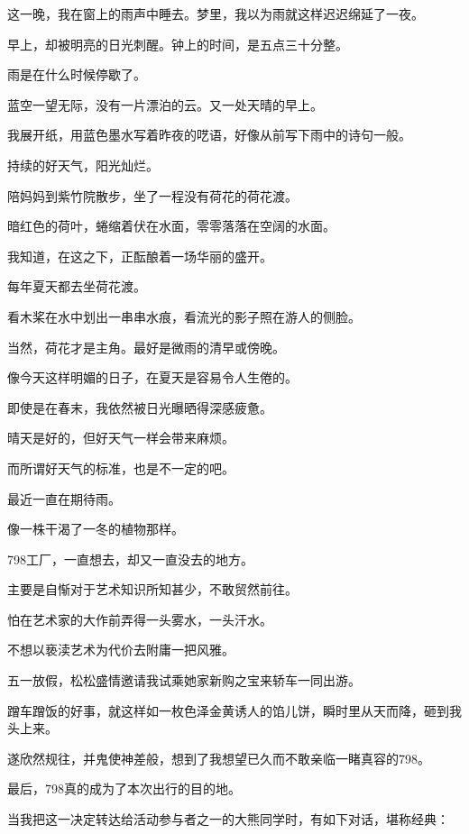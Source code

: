 		这一晚，我在窗上的雨声中睡去。梦里，我以为雨就这样迟迟绵延了一夜。\par
		早上，却被明亮的日光刺醒。钟上的时间，是五点三十分整。

		雨是在什么时候停歇了。

		蓝空一望无际，没有一片漂泊的云。又一处天晴的早上。\par
		我展开纸，用蓝色墨水写着昨夜的呓语，好像从前写下雨中的诗句一般。

	\endwriting



		持续的好天气，阳光灿烂。\par
		陪妈妈到紫竹院散步，坐了一程没有荷花的荷花渡。\par
		暗红色的荷叶，蜷缩着伏在水面，零零落落在空阔的水面。\par
		我知道，在这之下，正酝酿着一场华丽的盛开。\par
		每年夏天都去坐荷花渡。\par
		看木桨在水中划出一串串水痕，看流光的影子照在游人的侧脸。\par
		当然，荷花才是主角。最好是微雨的清早或傍晚。\par
		像今天这样明媚的日子，在夏天是容易令人生倦的。\par
		即使是在春末，我依然被日光曝晒得深感疲惫。\par
		晴天是好的，但好天气一样会带来麻烦。\par
		而所谓好天气的标准，也是不一定的吧。\par
		最近一直在期待雨。\par
		像一株干渴了一冬的植物那样。

	\endwriting



		798工厂，一直想去，却又一直没去的地方。\par
		主要是自惭对于艺术知识所知甚少，不敢贸然前往。\par
		怕在艺术家的大作前弄得一头雾水，一头汗水。\par
		不想以亵渎艺术为代价去附庸一把风雅。

		五一放假，松松盛情邀请我试乘她家新购之宝来轿车一同出游。\par
		蹭车蹭饭的好事，就这样如一枚色泽金黄诱人的馅儿饼，瞬时里从天而降，砸到我头上来。\par
		遂欣然规往，并鬼使神差般，想到了我想望已久而不敢亲临一睹真容的798。\par
		最后，798真的成为了本次出行的目的地。\par
		当我把这一决定转达给活动参与者之一的大熊同学时，有如下对话，堪称经典：

